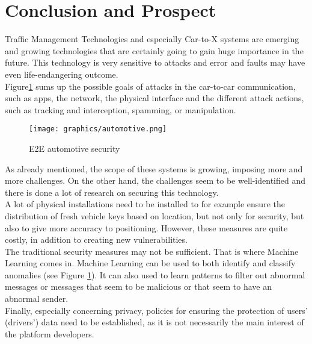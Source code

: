 \section{Conclusion and Prospect} 
Traffic Management Technologies and especially Car-to-X systems are emerging and growing technologies that are certainly going to gain huge importance in the future. This technology is very sensitive to attacks and error and faults may have even life-endangering outcome. \\
Figure\ref{fig:automotive} sums up the possible goals of attacks in the car-to-car communication, such as apps, the network, the physical interface and the different attack actions, such as tracking and interception, spamming, or manipulation. \\

\begin{figure}[h!]
        \centering
        \texttt{[image: graphics/automotive.png]}
        \caption{E2E automotive security \cite{automotive}}
        \label{fig:automotive}
\end{figure}

As already mentioned, the scope of these systems is growing, imposing more and more challenges. On the other hand, the challenges seem to be well-identified and there is done a lot of research on securing this technology. \\
A lot of physical installations need to be installed to for example ensure the distribution of fresh vehicle keys based on location, but not only for security, but also to give more accuracy to positioning. However, these measures are quite costly, in addition to creating new vulnerabilities. \\
The traditional security measures may not be sufficient. That is where Machine Learning comes in. Machine Learning can be used to both identify and classify anomalies (see Figure \ref{fig:automotive}). It can also used to learn patterns to filter out abnormal messages or messages that seem to be malicious or that seem to have an abnormal sender. \\
Finally, especially concerning privacy, policies for ensuring the protection of users' (drivers') data need to be established, as it is not necessarily the main interest of the platform developers.